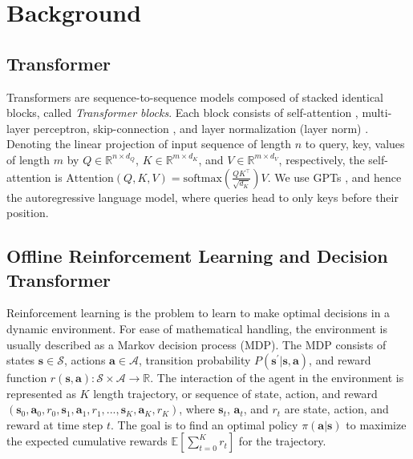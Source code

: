 \section{Background}
\label{section:background}

\subsection{Transformer}
\label{subsection:transformer}
Transformers are sequence-to-sequence models composed of stacked identical blocks, called \textit{Transformer blocks}. Each block consists of self-attention \cite{vaswani2017attention}, multi-layer perceptron, skip-connection \cite{he2016deep}, and layer normalization (layer norm) \cite{ba2016layer}. Denoting the linear projection of input sequence of length $n$ to query, key, values of length $m$ by $Q \in \mathbb{R}^{n \times d_Q}$, $K \in \mathbb{R}^{m \times d_K}$, and $V \in \mathbb{R}^{m \times d_V}$, respectively, the self-attention is $\text{Attention}(Q, K, V) = \text{softmax}\left( \frac{QK^{\top}}{\sqrt{d_K}} \right) V$. We use GPTs \cite{radford2018improving}, and hence the autoregressive language model, where queries head to only keys before their position.

\subsection{Offline Reinforcement Learning and Decision Transformer}
\label{subsection:decision-transformer}
Reinforcement learning is the problem to learn to make optimal decisions in a dynamic environment. For ease of mathematical handling, the environment is usually described as a Markov decision process (MDP). The MDP consists of states $\bm{s} \in \mathcal{S}$, actions $\bm{a} \in \mathcal{A}$, transition probability $P(\bm{s}^{\prime}|\bm{s}, \bm{a})$, and reward function $r(\bm{s}, \bm{a}): \mathcal{S} \times \mathcal{A} \to \mathbb{R}$. The interaction of the agent in the environment is represented as $K$ length trajectory, or sequence of state, action, and reward $(\bm{s}_0, \bm{a}_0, r_0, \bm{s}_1, \bm{a}_1, r_1, ..., \bm{s}_K, \bm{a}_K, r_K)$, where $\bm{s}_t$, $\bm{a}_t$, and $r_t$ are state, action, and reward at time step $t$. The goal is to find an optimal policy $\pi(\bm{a}|\bm{s})$ to maximize the expected cumulative rewards $\mathbb{E}[\sum_{t=0}^Kr_t]$ 
for the trajectory.

